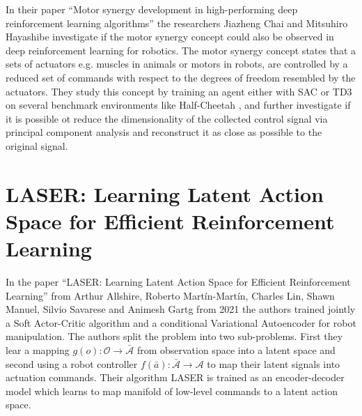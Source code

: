 In their paper ``Motor synergy development in high-performing deep reinforcement learning algorithms''\cite{Motor_Synergy_Learning} the researchers Jiazheng Chai and  Mitsuhiro Hayashibe investigate if the motor synergy concept could also be observed in deep reinforcement learning for robotics. The motor synergy concept states that a sets of actuators e.g. muscles in animals or motors in robots, are controlled by a reduced set of commands with respect to the degrees of freedom resembled by the actuators. They study this concept by training an agent either with SAC or TD3 on several benchmark environments like Half-Cheetah \cite{Half_Cheetah}, and further investigate if it is possible ot reduce the dimensionality of the collected control signal via principal component analysis \cite{PCA} and reconstruct it as close as possible to the original signal.


\section{LASER: Learning Latent Action Space for Efficient Reinforcement Learning}

In the paper ``LASER: Learning Latent Action Space for Efficient Reinforcement Learning'' from Arthur Allshire, Roberto Martín-Martín, Charles Lin, Shawn Manuel, Silvio Savarese and Animesh Gartg from 2021 \cite{LASER} the authors trained jointly a Soft Actor-Critic algorithm and a conditional Variational Autoencoder for robot manipulation. The authors split the problem into two sub-problems. First they lear a mapping $g(o): \mathcal{O} \to \bar{\mathcal{A}}$ from observation space into a latent space and second using a robot controller $f(\bar{a}): \bar{\mathcal{A}} \to \mathcal{A}$ to map their latent signals into actuation commands. Their algorithm LASER is trained as an encoder-decoder model which learns to map manifold of low-level commands to a latent action space. 

% 


